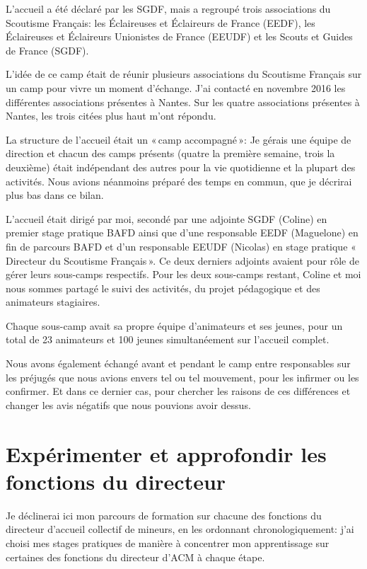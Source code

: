 \documentclass[titlepage,11pt,a4paper]{article}
\begin{document}
L'accueil a été déclaré par les SGDF, mais a regroupé trois associations du Scoutisme
Français: les Éclaireuses et Éclaireurs de France (EEDF), les Éclaireuses et Éclaireurs
Unionistes de France (EEUDF) et les Scouts et Guides de France (SGDF).

L'idée de ce camp était de réunir plusieurs associations du Scoutisme Français sur un camp
pour vivre un moment d'échange. J'ai contacté
en novembre 2016 les différentes associations présentes à Nantes. Sur les quatre associations
présentes à Nantes, les trois citées plus haut m'ont répondu.


La structure de l'accueil était un «\,camp accompagné\,»: Je gérais une équipe de
direction et chacun des camps présents (quatre la première semaine, trois la deuxième)
était indépendant des autres pour la vie quotidienne et la plupart des activités. Nous
avions néanmoins préparé des temps en commun, que je décrirai plus bas dans ce bilan.

L'accueil était dirigé par moi, secondé par une adjointe SGDF (Coline) en premier stage pratique BAFD
ainsi que d'une responsable EEDF (Maguelone) en fin de parcours BAFD et d'un responsable
EEUDF (Nicolas) en stage pratique «\,Directeur du Scoutisme Français\,».
Ce deux derniers adjoints avaient pour rôle de gérer leurs sous-camps respectifs.
Pour les deux sous-camps restant, Coline et moi nous sommes partagé le suivi des activités, du
projet pédagogique et des animateurs stagiaires.

Chaque sous-camp avait sa propre équipe d'animateurs et ses jeunes, pour un total de 23
animateurs et 100 jeunes simultanéement sur l'accueil complet.

Nous avons également échangé avant et pendant le camp entre responsables sur les préjugés
que nous avions envers tel ou tel mouvement, pour les infirmer ou les confirmer. Et dans
ce dernier cas, pour chercher les raisons de ces différences et changer les avis négatifs
que nous pouvions avoir dessus.

\section{Expérimenter et approfondir les fonctions du directeur}

Je déclinerai ici mon parcours de formation sur chacune des fonctions du directeur
d'accueil collectif de mineurs, en les ordonnant chronologiquement: j'ai choisi mes stages
pratiques de manière à concentrer mon apprentissage sur certaines des fonctions du directeur d'ACM à
chaque étape.
\end{document}
